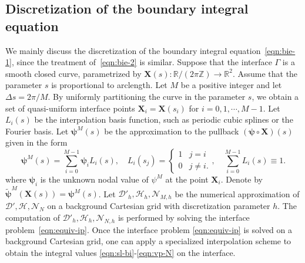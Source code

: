 \documentclass[preprint,11pt]{elsarticle}
\theoremstyle{remark}
\newcommand{\mc}[1]{\mathcal{#1}}
\newcommand{\wt}[1]{\widetilde{#1}}
\newcommand{\bm}[1]{\boldsymbol{#1}}
\begin{document}
\subsection{Discretization of the boundary integral equation}
We mainly discuss the discretization of the boundary integral equation~\eqref{eqn:bie-1}, since the treatment of~\eqref{eqn:bie-2} is similar.
Suppose that the interface $\Gamma$ is a smooth closed curve, parametrized by $\bm X(s): \mathbb R/(2\pi\mathbb Z) \to \mathbb R^2$. Assume that the parameter $s$ is proportional to arclength. Let $M$ be a positive integer and let $\Delta s = 2\pi/M$. By uniformly partitioning the curve in the parameter $s$, we obtain a set of quasi-uniform interface points $\bm X_i = \bm X(s_i)$ for $i = 0,1,\cdots, M-1$. 
Let $L_i(s)$ be the interpolation basis function, such as periodic cubic splines or the Fourier basis.
Let $\bm \psi^M(s)$ be the approximation to the pullback $(\bm\psi \circ \bm X) (s)$ given in the form
\begin{equation}
    \bm \psi^M(s) = \sum_{i = 0}^{M-1} \bm\psi_i L_i(s),\quad L_i(s_j) =
    \begin{cases}
        1 & j = i\\
        0 & j \neq i.
    \end{cases},\quad
    \sum_{i = 0}^{M-1} L_i(s) \equiv 1.
\end{equation}
where $\bm \psi_i$ is the unknown nodal value of $\psi^M$ at the point $\bm X_i$. 
Denote by $\wt{\bm \psi}^M(\bm X(s)) = \bm \psi^M(s)$.
Let $\mc D'_h, \mc H_h, \mc N_{M,h}$ be the numerical approximation of $\mc D', \mc H, \mc N_N$ on a background Cartesian grid with discretization parameter $h$. 
The computation of $\mc D'_h, \mc H_h, \mc N_{N,h}$ is performed by solving the interface problem~\eqref{eqn:equiv-ip}. Once the interface problem \eqref{eqn:equiv-ip} is solved on a background Cartesian grid, one can apply a specialized interpolation scheme to obtain the integral values \eqref{eqn:sl-bi}-\eqref{eqn:vp-N} on the interface.
\end{document}
